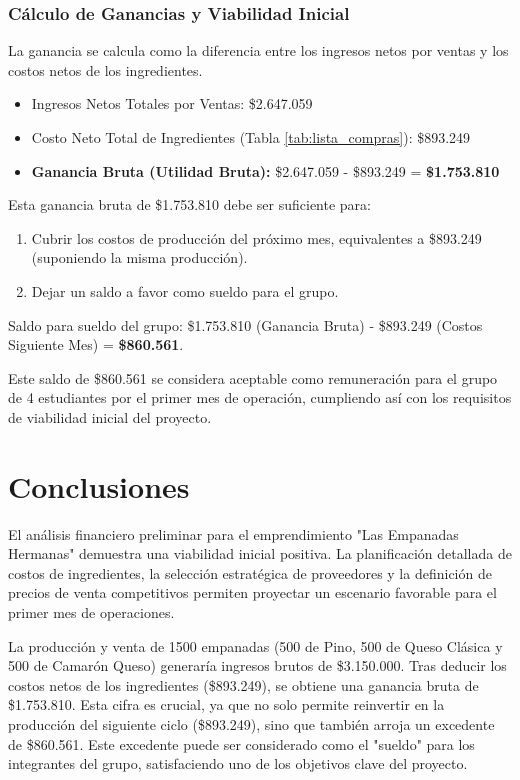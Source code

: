 \documentclass[12pt]{article}
\begin{document}
    \subsubsection{Cálculo de Ganancias y Viabilidad Inicial}
    La ganancia se calcula como la diferencia entre los ingresos netos por ventas y los costos netos de los ingredientes.

    \begin{itemize}
        \item Ingresos Netos Totales por Ventas: \$2.647.059
        \item Costo Neto Total de Ingredientes (Tabla \ref{tab:lista_compras}): \$893.249
        \item \textbf{Ganancia Bruta (Utilidad Bruta):} \$2.647.059 - \$893.249 = \textbf{\$1.753.810}
    \end{itemize}

    Esta ganancia bruta de \$1.753.810 debe ser suficiente para:
    \begin{enumerate}
        \item Cubrir los costos de producción del próximo mes, equivalentes a \$893.249 (suponiendo la misma producción).
        \item Dejar un saldo a favor como sueldo para el grupo.
    \end{enumerate}
    Saldo para sueldo del grupo: \$1.753.810 (Ganancia Bruta) - \$893.249 (Costos Siguiente Mes) = \textbf{\$860.561}.

    Este saldo de \$860.561 se considera aceptable como remuneración para el grupo de 4 estudiantes por el primer mes de operación, cumpliendo así con los requisitos de viabilidad inicial del proyecto.

    \newpage


\section{Conclusiones} %
El análisis financiero preliminar para el emprendimiento "Las Empanadas Hermanas" demuestra una viabilidad inicial positiva. La planificación detallada de costos de ingredientes, la selección estratégica de proveedores y la definición de precios de venta competitivos permiten proyectar un escenario favorable para el primer mes de operaciones.

La producción y venta de 1500 empanadas (500 de Pino, 500 de Queso Clásica y 500 de Camarón Queso) generaría ingresos brutos de \$3.150.000. Tras deducir los costos netos de los ingredientes (\$893.249), se obtiene una ganancia bruta de \$1.753.810. Esta cifra es crucial, ya que no solo permite reinvertir en la producción del siguiente ciclo (\$893.249), sino que también arroja un excedente de \$860.561. Este excedente puede ser considerado como el "sueldo" para los integrantes del grupo, satisfaciendo uno de los objetivos clave del proyecto.
\end{document}
